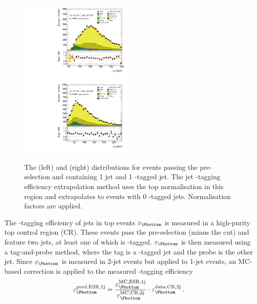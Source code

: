 \begin{figure}[t]
	\includegraphics[width=0.495\textwidth]{tex/backgrounds/emme_CutMTW_1j_noSubBjet_Btagged_MT_TrackHWW_Clj_mh125_lin}
	\hfill
	\includegraphics[width=0.495\textwidth]{tex/backgrounds/emme_CutMTW_1j_noSubBjet_Btagged_Mll_mh125_lin}
	\caption{The \mt (left) and \mll (right) distributions for events passing the 
	pre-selection and containing 1 jet and 1 \Pbottom-tagged jet. The jet \Pbottom-tagging 
	efficiency extrapolation method uses the top normalisation in this region and 
	extrapolates to events with 0 \Pbottom-tagged jets. Normalisation factors are applied.}
	\label{fig:top:jbee}
\end{figure}

The \Pbottom-tagging efficiency of jets in top events $\varepsilon_{\Pbottom}$ is measured 
in a high-purity top control region (CR). These events pass the pre-selection (minus the 
\corrtrackmet cut) and feature two jets, at least one of which is \Pbottom-tagged. 
$\varepsilon_{\Pbottom}$ is then measured using a tag-and-probe method, where the tag is a 
\Pbottom-tagged jet and the probe is the other jet. Since $\varepsilon_{\Pbottom}$ is 
measured in 2-jet events but applied to 1-jet events, an MC-based correction is applied to 
the measured \Pbottom-tagging efficiency
\begin{equation}
	\varepsilon_{\Pbottom}^{\text{pred,ESR,1j}} = \frac{\varepsilon_{\Pbottom}^{\text{MC,ESR,1j}}}{\varepsilon_{\Pbottom}^{\text{MC,CR,2j}}} \cdot \varepsilon_{\Pbottom}^{\text{data,CR,2j}} \,.
	\label{eq:top:jbee}
\end{equation}

